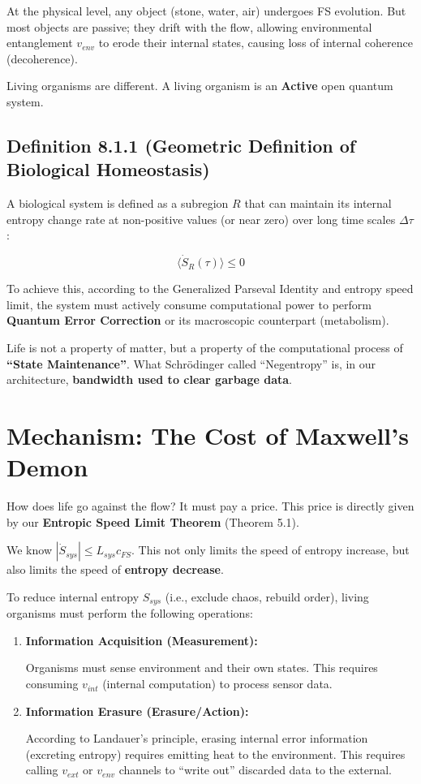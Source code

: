 At the physical level, any object (stone, water, air) undergoes FS evolution. But most objects are passive; they drift with the flow, allowing environmental entanglement $v_{env}$ to erode their internal states, causing loss of internal coherence (decoherence).

Living organisms are different. A living organism is an \textbf{Active} open quantum system.

\subsection{Definition 8.1.1 (Geometric Definition of Biological Homeostasis)}

A biological system is defined as a subregion $R$ that can maintain its internal entropy change rate at non-positive values (or near zero) over long time scales $\Delta \tau$:

$$\langle \dot{S}_{R}(\tau) \rangle \le 0$$

To achieve this, according to the Generalized Parseval Identity and entropy speed limit, the system must actively consume computational power to perform \textbf{Quantum Error Correction} or its macroscopic counterpart (metabolism).

Life is not a property of matter, but a property of the computational process of \textbf{``State Maintenance''}. What Schrödinger called ``Negentropy'' is, in our architecture, \textbf{bandwidth used to clear garbage data}.

\section{Mechanism: The Cost of Maxwell's Demon}

How does life go against the flow? It must pay a price. This price is directly given by our \textbf{Entropic Speed Limit Theorem} (Theorem 5.1).

We know $|\dot{S}_{sys}| \le L_{sys} c_{FS}$. This not only limits the speed of entropy increase, but also limits the speed of \textbf{entropy decrease}.

To reduce internal entropy $S_{sys}$ (i.e., exclude chaos, rebuild order), living organisms must perform the following operations:

\begin{enumerate}
\item \textbf{Information Acquisition (Measurement):}

   Organisms must sense environment and their own states. This requires consuming \textbf{$v_{int}$} (internal computation) to process sensor data.

\item \textbf{Information Erasure (Erasure/Action):}

   According to Landauer's principle, erasing internal error information (excreting entropy) requires emitting heat to the environment. This requires calling \textbf{$v_{ext}$} or \textbf{$v_{env}$} channels to ``write out'' discarded data to the external.
\end{enumerate}

